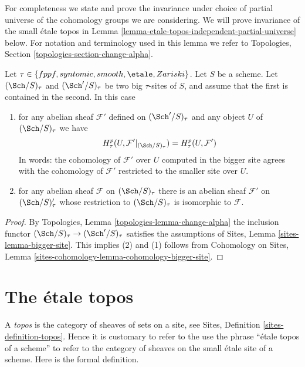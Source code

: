 \noindent
For completeness we state and prove the invariance under choice of partial
universe of the cohomology groups we are considering. We will prove invariance
of the small \'etale topos in
Lemma \ref{lemma-etale-topos-independent-partial-universe} below.
For notation and terminology used in this lemma we refer to
Topologies, Section \ref{topologies-section-change-alpha}.

\begin{lemma}
\label{lemma-cohomology-enlarge-partial-universe}
Let $\tau \in \{fppf, syntomic, smooth, \etale, Zariski\}$.
Let $S$ be a scheme.
Let $(\Sch/S)_\tau$ and $(\Sch'/S)_\tau$ be two
big $\tau$-sites of $S$, and assume that the first is contained in the second.
In this case
\begin{enumerate}
\item for any abelian sheaf $\mathcal{F}'$ defined on $(\Sch'/S)_\tau$ and
any object $U$ of $(\Sch/S)_\tau$ we have
$$
H^p_\tau(U, \mathcal{F}'|_{(\Sch/S)_\tau}) =
H^p_\tau(U, \mathcal{F}')
$$
In words: the cohomology of $\mathcal{F}'$ over $U$ computed in the bigger site
agrees with the cohomology of $\mathcal{F}'$ restricted to the smaller site
over $U$.
\item for any abelian sheaf $\mathcal{F}$ on $(\Sch/S)_\tau$ there is an
abelian sheaf $\mathcal{F}'$ on $(\Sch/S)_\tau'$ whose restriction to
$(\Sch/S)_\tau$ is isomorphic to $\mathcal{F}$.
\end{enumerate}
\end{lemma}

\begin{proof}
By Topologies, Lemma \ref{topologies-lemma-change-alpha} the inclusion functor
$(\Sch/S)_\tau \to (\Sch'/S)_\tau$ satisfies the assumptions of
Sites, Lemma \ref{sites-lemma-bigger-site}. This implies (2) and (1)
follows from
Cohomology on Sites, Lemma \ref{sites-cohomology-lemma-cohomology-bigger-site}.
\end{proof}




\section{The \'etale topos}
\label{section-etale-topos}

\noindent
A {\it topos} is the category of sheaves of sets on a site, see
Sites, Definition \ref{sites-definition-topos}. Hence it is customary
to refer to the use the phrase ``\'etale topos of a scheme'' to refer to
the category of sheaves on the small \'etale site of a scheme.
Here is the formal definition.

